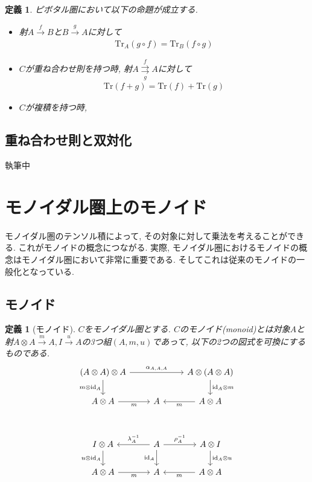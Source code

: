 \documentclass[a4paper,12pt]{ltjsarticle}
\theoremstyle{break}
\newtheorem{defn}[thm]{定義}
\newcommand{\xr}[1]{\xrightarrow{#1}}
\newcommand{\id}{\mathrm{id}}
\newcommand{\ci}{\circ}
\newcommand{\al}{\alpha}
\newcommand{\la}{\lambda}
\newcommand{\ot}{\otimes}
\newcommand{\tra}{\mathrm{Tr}}
\numberwithin{equation}{section}
\begin{document}
\begin{defn}
  ピボタル圏において以下の命題が成立する. 
  \begin{itemize}
    \item 射$A \xr{f} B$と$B \xr{g} A$に対して
    \begin{align*}
      \tra_A(g \ci f)=\tra_B(f \ci g)
    \end{align*}
    \item $C$が重ね合わせ則を持つ時, 射$A \overset{f}{\underset{g}{\rightrightarrows}} A$に対して
    \begin{align*}
      \tra(f+g)=\tra(f)+\tra(g)
    \end{align*}
    \item $C$が複積を持つ時, 
  \end{itemize}
\end{defn}

\subsection{重ね合わせ則と双対化}

執筆中

\newpage

\section{モノイダル圏上のモノイド}

モノイダル圏のテンソル積によって, その対象に対して乗法を考えることができる. 
これがモノイドの概念につながる. 
実際, モノイダル圏におけるモノイドの概念はモノイダル圏において非常に重要である. 
そしてこれは従来のモノイドの一般化となっている. 

\subsection{モノイド}

\begin{defn}[モノイド]
  $C$をモノイダル圏とする. 
  $C$のモノイド(monoid)とは対象$A$と射$A \ot A \xr{m} A, I \xr{u} A$の3つ組$(A,m,u)$であって, 以下の2つの図式を可換にするものである. 
  \[\begin{tikzcd}
    {(A \ot A) \ot A} && {A \ot (A \ot A)} \\
    {A \ot A} & A & {A \ot A} \\
    \\
    {I \ot A} & A & {A \ot I} \\
    {A \ot A} & A & {A \ot A}
    \arrow["{\id_A \ot m}", from=1-3, to=2-3]
    \arrow["{\al_{A,A,A}}", from=1-1, to=1-3]
    \arrow["{m \ot \id_A}"', from=1-1, to=2-1]
    \arrow["m", from=2-3, to=2-2]
    \arrow["m"', from=2-1, to=2-2]
    \arrow["\id_A"', from=4-2, to=5-2]
    \arrow["{\rho_A^{-1}}", from=4-2, to=4-3]
    \arrow["{\id_A \ot u}", from=4-3, to=5-3]
    \arrow["m", from=5-3, to=5-2]
    \arrow["{\la_A^{-1}}"', from=4-2, to=4-1]
    \arrow["{u \ot \id_A}"', from=4-1, to=5-1]
    \arrow["m"', from=5-1, to=5-2]
  \end{tikzcd}\]
\end{defn}
\end{document}
